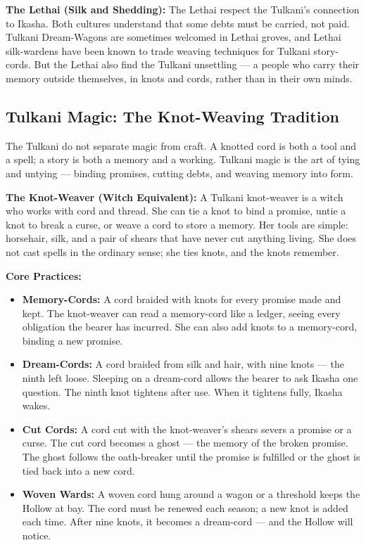 \textbf{The Lethai (Silk and Shedding):} The Lethai respect the Tulkani's connection to Ikasha. Both cultures understand that some debts must be carried, not paid. Tulkani Dream-Wagons are sometimes welcomed in Lethai groves, and Lethai silk-wardens have been known to trade weaving techniques for Tulkani story-cords. But the Lethai also find the Tulkani unsettling --- a people who carry their memory outside themselves, in knots and cords, rather than in their own minds.

\subsection*{Tulkani Magic: The Knot-Weaving Tradition}
\label{subsec:tulkani-magic}

The Tulkani do not separate magic from craft. A knotted cord is both a tool and a spell; a story is both a memory and a working. Tulkani magic is the art of tying and untying --- binding promises, cutting debts, and weaving memory into form.

\textbf{The Knot-Weaver (Witch Equivalent):} A Tulkani knot-weaver is a witch who works with cord and thread. She can tie a knot to bind a promise, untie a knot to break a curse, or weave a cord to store a memory. Her tools are simple: horsehair, silk, and a pair of shears that have never cut anything living. She does not cast spells in the ordinary sense; she ties knots, and the knots remember.

\textbf{Core Practices:}
\begin{itemize}
    \item \textbf{Memory-Cords:} A cord braided with knots for every promise made and kept. The knot-weaver can read a memory-cord like a ledger, seeing every obligation the bearer has incurred. She can also add knots to a memory-cord, binding a new promise.
    \item \textbf{Dream-Cords:} A cord braided from silk and hair, with nine knots --- the ninth left loose. Sleeping on a dream-cord allows the bearer to ask Ikasha one question. The ninth knot tightens after use. When it tightens fully, Ikasha wakes.
    \item \textbf{Cut Cords:} A cord cut with the knot-weaver's shears severs a promise or a curse. The cut cord becomes a ghost --- the memory of the broken promise. The ghost follows the oath-breaker until the promise is fulfilled or the ghost is tied back into a new cord.
    \item \textbf{Woven Wards:} A woven cord hung around a wagon or a threshold keeps the Hollow at bay. The cord must be renewed each season; a new knot is added each time. After nine knots, it becomes a dream-cord --- and the Hollow will notice.
\end{itemize}

